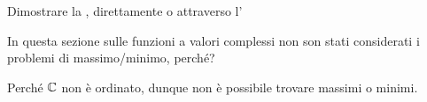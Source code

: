 \begin{exercise}
	Dimostrare la , direttamente o attraverso l'
\end{exercise}
\begin{exercise}
	In questa sezione sulle funzioni a valori complessi non son stati considerati i problemi di massimo/minimo, perché?
	\begin{solution}
		Perché $\mathbb{C}$ non è ordinato, dunque non è possibile trovare massimi o minimi.
	\end{solution}
\end{exercise}